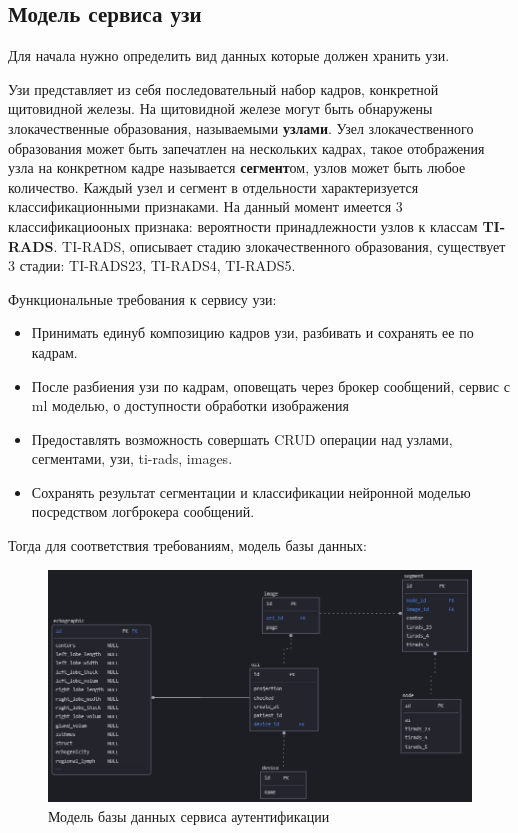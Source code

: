 \subsection{Модель сервиса узи}
Для начала нужно определить вид данных которые должен хранить узи.

Узи представляет из себя последовательный набор кадров, конкретной щитовидной железы. На щитовидной
железе могут быть обнаружены злокачественные образования, называемыми \textbf{узлами}. Узел злокачественного образования
может быть запечатлен на нескольких кадрах, такое отображения узла на конкретном кадре называется \textbf{сегмент}ом,
узлов может быть любое количество. Каждый узел и сегмент в отдельности характеризуется классификационными признаками.
На данный момент имеется 3 классификациооных признака: вероятности принадлежности узлов к классам \textbf{TI-RADS}.
TI-RADS, описывает стадию злокачественного образования, существует 3 стадии: TI-RADS23, TI-RADS4, TI-RADS5.

Функциональные требования к сервису узи:
\begin{itemize}
  \item Принимать единуб композицию кадров узи, разбивать и сохранять ее по кадрам.
  \item После разбиения узи по кадрам, оповещать через брокер сообщений, сервис с ml моделью, о доступности обработки изображения
  \item Предоставлять возможность совершать CRUD операции над узлами, сегментами, узи, ti-rads, images.
  \item Сохранять результат сегментации и классификации нейронной моделью посредством логброкера сообщений.
\end{itemize}


Тогда для соответствия требованиям, модель базы данных:
\begin{figure}[H]%
	\begin{center}
		\includegraphics[width=.5\columnwidth]{./img/uzi_db_model.png}%
	\end{center}
	\caption{Модель базы данных сервиса аутентификации}%
	\label{pic:auth_db}%
\end{figure}


